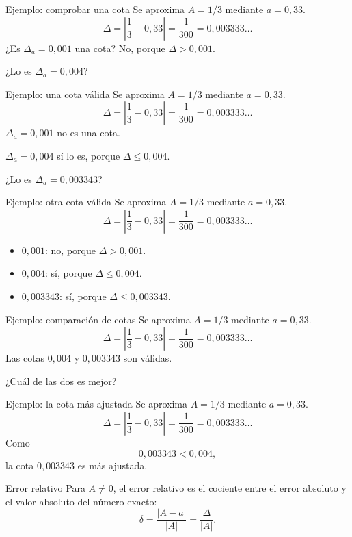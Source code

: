 \documentclass[main.tex]{subfiles}
\begin{document}
\begin{frame}{Ejemplo: comprobar una cota}
Se aproxima $A=1/3$ mediante $a=0{,}33$.\[\Delta=\left|\frac13-0{,}33\right|=\frac1{300}=0{,}003333\ldots\]¿Es $\Delta_a=0{,}001$ una cota? No, porque $\Delta>0{,}001$.\par\medskip ¿Lo es $\Delta_a=0{,}004$?
\end{frame}

\begin{frame}{Ejemplo: una cota válida}
Se aproxima $A=1/3$ mediante $a=0{,}33$.\[\Delta=\left|\frac13-0{,}33\right|=\frac1{300}=0{,}003333\ldots\]$\Delta_a=0{,}001$ no es una cota.\par\medskip $\Delta_a=0{,}004$ sí lo es, porque $\Delta\le0{,}004$.\par\medskip ¿Lo es $\Delta_a=0{,}003343$?
\end{frame}

\begin{frame}{Ejemplo: otra cota válida}
Se aproxima $A=1/3$ mediante $a=0{,}33$.\[\Delta=\left|\frac13-0{,}33\right|=\frac1{300}=0{,}003333\ldots\]\begin{itemize}\item $0{,}001$: no, porque $\Delta>0{,}001$.\item $0{,}004$: sí, porque $\Delta\le0{,}004$.\item $0{,}003343$: sí, porque $\Delta\le0{,}003343$.\end{itemize}
\end{frame}

\begin{frame}{Ejemplo: comparación de cotas}
Se aproxima $A=1/3$ mediante $a=0{,}33$.\[\Delta=\left|\frac13-0{,}33\right|=\frac1{300}=0{,}003333\ldots\]Las cotas $0{,}004$ y $0{,}003343$ son válidas.\par\medskip ¿Cuál de las dos es mejor?
\end{frame}

\begin{frame}{Ejemplo: la cota más ajustada}
Se aproxima $A=1/3$ mediante $a=0{,}33$.\[\Delta=\left|\frac13-0{,}33\right|=\frac1{300}=0{,}003333\ldots\]Como\[0{,}003343<0{,}004,\]la cota $0{,}003343$ es más ajustada.
\end{frame}

\begin{frame}{Error relativo}
Para $A\ne0$, el error relativo es el cociente entre el error absoluto y el valor absoluto del número exacto:\[\boxed{\delta=\frac{|A-a|}{|A|}=\frac\Delta{|A|}.}\]
\end{frame}
\end{document}
